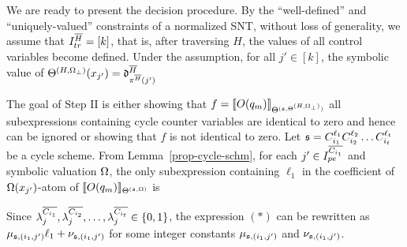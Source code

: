 We are ready to present the decision procedure. By the ``well-defined'' and ``uniquely-valued'' constraints of a normalized SNT, without loss of generality, we assume that $I^{\overline{H}}_{tr}=[k]$, that is, after traversing $H$, the values of all control variables become defined.
Under the assumption, for all $j' \in [k]$, the symbolic value of $\Theta^{(H,\Omega_\bot)}(x_{j'})=\mathfrak{d}^{\overline{H}}_{\pi^{\overline{H}}(j')}$\smallskip\\
\bigskip

The goal of Step II is either showing that $f=\llbracket O(q_m)\rrbracket_{\Theta^{({\mathfrak{s} },\Theta^{(H,\Omega_\bot)})}}$ all subexpressions containing cycle counter variables are identical to zero and hence can be ignored or showing that $f$ is not identical to zero. Let ${\mathfrak{s} }=C_{i_1}^{\ell_1} C_{i_2}^{\ell_2} \dots C_{i_t}^{\ell_t}$ be a cycle scheme. From Lemma~\ref{prop-cycle-schm}, for each $j'\in I^{\overline{C_{i_1}}}_{pe}$ and symbolic valuation $\Omega$, the only subexpression containing $\ell_1$ in the coefficient of $\Omega(x_{j'})$-atom of $\llbracket O(q_m)\rrbracket_{\Theta^{({\mathfrak{s} },\Omega)}}$ is
\begin{center}
\end{center}
Since $\lambda^{\overline{C_{i_1}}}_{j}, \lambda^{\overline{C_{i_2}}}_{j}, \dots, \lambda^{\overline{C_{i_t}}}_{j} \in \{0, 1\}$, the expression $(\ast)$  can be rewritten as  
 $\mu_{{\mathfrak{s} }, (i_1,j')} \ell_1 + \nu_{{\mathfrak{s} }, (i_1,j')}$ for some integer constants $\mu_{{\mathfrak{s} }, (i_1,j')}$ and $\nu_{{\mathfrak{s} }, (i_1,j')}$. 
 
